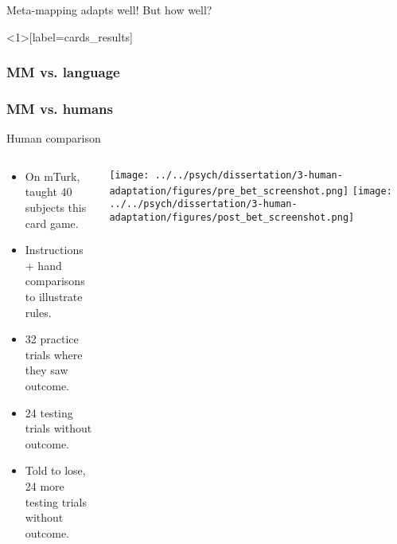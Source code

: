 \documentclass{beamer}
\begin{document}
\begin{frame}[standout]
Meta-mapping adapts well! But how well?
\end{frame}


\begin{frame}<1>[label=cards_results]
\frametitle<1>{MM vs. language}
\frametitle<2->{MM vs. humans}
\end{frame}

\begin{frame}{Human comparison}
\begin{columns}
\begin{column}{0.5\textwidth}
\begin{itemize}
\item On mTurk, taught 40 subjects this card game.
\item Instructions + hand comparisons to illustrate rules.
\item 32 practice trials where they saw outcome.
\item 24 testing trials without outcome.
\item Told to lose, 24 more testing trials without outcome.
\end{itemize}
\end{column}

\begin{column}{0.5\textwidth}
\vspace{1em}
\texttt{[image: ../../psych/dissertation/3-human-adaptation/figures/pre\_bet\_screenshot.png]}
\texttt{[image: ../../psych/dissertation/3-human-adaptation/figures/post\_bet\_screenshot.png]}
\end{column}
\end{columns}

\end{frame}
\end{document}
